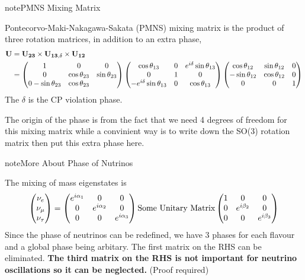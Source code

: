 \documentclass[letterpaper,12pt,english]{sphinxmanual}
\begin{document}
\begin{notice}{note}{PMNS Mixing Matrix}

Pontecorvo-Maki-Nakagawa-Sakata (PMNS) mixing matrix is the product of three rotation matrices, in addition to an extra phase,
\begin{gather}
\begin{split}\mathbf U &= \mathbf {U_{23}} \times \mathbf {U_{13,\delta}} \times \mathbf {U_{12}} \\
& = \begin{pmatrix} 1 & 0 & 0 \\ 0 &\cos\theta_{23} & \sin\theta_{23} \\ 0 -\sin\theta_{23} & \cos\theta_{23} \end{pmatrix}  \begin{pmatrix} \cos\theta_{13} & 0 & e^{i\delta} \sin\theta_{13} \\ 0 & 1 & 0 \\ -e^{i\delta}\sin\theta_{13} & 0 & \cos\theta_{13}  \end{pmatrix} \begin{pmatrix} \cos\theta_{12} & \sin\theta_{12} & 0 \\ -\sin\theta_{12} & \cos \theta_{12} & 0 \\ 0 & 0 & 1 \end{pmatrix}\end{split}\notag
\end{gather}
The \(\delta\) is the CP violation phase.

The origin of the phase is from the fact that we need 4 degrees of freedom for this mixing matrix while a convinient way is to write down the SO(3) rotation matrix then put this extra phase here.
\end{notice}

\begin{notice}{note}{More About Phase of Nutrinos}

The mixing of mass eigenstates is
\begin{gather}
\begin{split}\begin{pmatrix} \nu_e \\ \nu_\mu \\ \nu_\tau  \end{pmatrix} = \begin{pmatrix} e^{i\alpha_1} & 0 & 0 \\ 0 & e^{i\alpha_2} & 0 \\ 0 & 0 & e^{i\alpha_3} \end{pmatrix} \text{Some Unitary Matrix} \begin{pmatrix} 1 & 0 & 0 \\ 0 & e^{i\beta_2} & 0 \\ 0 & 0 & e^{i\beta_3} \end{pmatrix}\end{split}\notag
\end{gather}
Since the phase of neutrinos can be redefined, we have 3 phases for each flavour and a global phase being arbitary. The first matrix on the RHS can be eliminated. \textbf{The third matrix on the RHS is not important for neutrino oscillations so it can be neglected.} (Proof required)
\end{notice}
\end{document}
